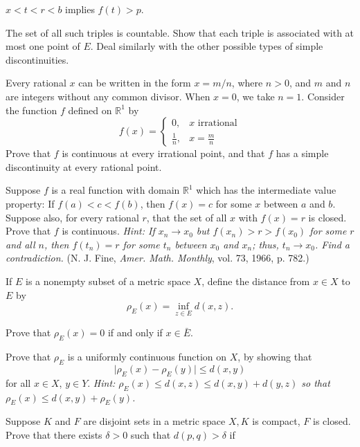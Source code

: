 \begin{exercise}
\begin{exercise}[label = (\alph*)]
  \item
    \(x < t < r < b\) implies \(f(t) > p\).
  \end{exercise}
  The set of all such triples is countable.
  Show that each triple is associated with at most one point of \(E\).
  Deal similarly with the other possible types of simple discontinuities.
\item
  Every rational \(x\) can be written in the form \(x = m/n\), where \(n > 0\),
  and \(m\) and \(n\) are integers without any common divisor.
  When \(x = 0\), we take \(n = 1\).
  Consider the function \(f\) defined on \(\mathbb{R}^1\) by
  \[
  f(x) =
  \begin{cases}
    0, & x\text{ irrational}\\
    \frac{1}{n}, & x = \frac{m}{n}
  \end{cases}
  \]
  Prove that \(f\) is continuous at every irrational point, and that \(f\) has
  a simple discontinuity at every rational point.
\item
  Suppose \(f\) is a real function with domain \(\mathbb{R}^1\) which has the
  intermediate value property: If \(f(a) < c < f(b)\), then \(f(x) = c\) for
  some \(x\) between \(a\) and \(b\).
  Suppose also, for every rational \(r\), that the set of all \(x\) with
  \(f(x) = r\) is closed.
  Prove that \(f\) is continuous.
  \textit{Hint: If \(x_n\to x_0\) but \(f(x_n) > r > f(x_0)\) for some \(r\)
    and all \(n\), then \(f(t_n) = r\) for some \(t_n\) between \(x_0\) and
    \(x_n\); thus, \(t_n\to x_0\).
    Find a contradiction.}
  (N. J. Fine, \textit{Amer. Math. Monthly}, vol. 73, 1966, p. 782.)
\item
  If \(E\) is a nonempty subset of a metric space \(X\), define the distance
  from \(x\in X\) to \(E\) by
  \[
  \rho_E(x) = \inf_{z\in E} d(x, z).
  \]
  \begin{exercise}[label = (\alph*)]
  \item
    Prove that \(\rho_E(x) = 0\) if and only if \(x\in\bar{E}\).
  \item
    Prove that \(\rho_E\) is a uniformly continuous function on \(X\), by
    showing that
    \[
    \lvert\rho_E(x) - \rho_E(y)\rvert\leq d(x, y)
    \]
    for all \(x\in X\), \(y\in Y\).
    \textit{Hint: \(\rho_E(x)\leq d(x,z)\leq d(x,y) + d(y,z)\) so that
      \(\rho_E(x)\leq d(x,y) + \rho_E(y)\).}
  \end{exercise}
\item
  Suppose \(K\) and \(F\) are disjoint sets in a metric space \(X,K\) is
  compact, \(F\) is closed.
  Prove that there exists \(\delta > 0\) such that \(d(p,q) > \delta\) if

\end{exercise}
